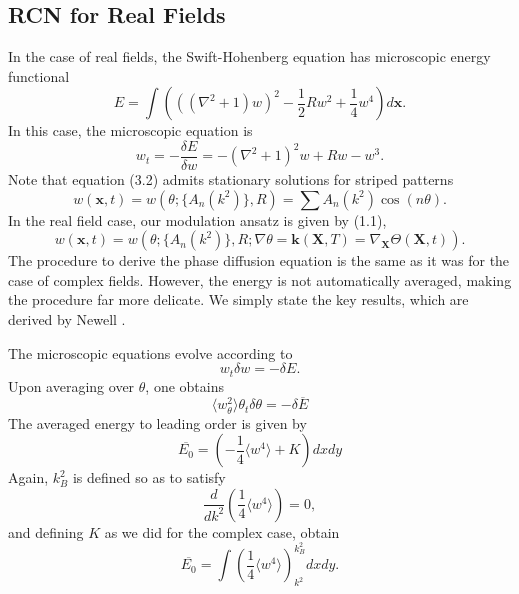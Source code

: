 \documentclass[12pt]{article}
\numberwithin{equation}{section}
\begin{document}
\subsection{RCN for Real Fields}
In the case of real fields, the Swift-Hohenberg equation has microscopic energy functional
\begin{equation}
E = \int \left( ((\nabla^2+1)w)^2-\frac{1}{2}Rw^2 + \frac{1}{4}w^4 \right)d\bm{x}.
\end{equation}
In this case, the microscopic equation is
\begin{equation}
w_t = -\frac{\delta E}{\delta w} = -(\nabla^2+1)^2w + Rw - w^3.
\end{equation}
Note that equation (3.2) admits stationary solutions for striped patterns
\begin{equation}
w(\bm{x},t) = w(\theta; \{A_n(k^2)\},R) = \sum A_n(k^2)\cos(n\theta).
\end{equation}
In the real field case, our modulation ansatz is given by (1.1),
\begin{equation}
w(\bm{x},t) = w(\theta; \{A_n(k^2)\},R; \nabla \theta = \bm{k}(\bm{X},T)=\nabla_{\bm{X}}\Theta(\bm{X},t)).
\end{equation}
The procedure to derive the phase diffusion equation is the same as it was for the case of complex fields. However, the energy is not automatically averaged, making the procedure far more delicate. We simply state the key results, which are derived by Newell \cite{NEWELL2023}.
\par
The microscopic equations evolve according to
\begin{equation}
 w_t \delta w = -\delta E.
\end{equation}
Upon averaging over $\theta$, one obtains
\begin{equation}
 \langle w_{\theta}^2\rangle\theta_t \delta \theta = -\delta \overline{E}
\end{equation}
The averaged energy to leading order is given by
\begin{equation}
\overline{E_0} = \left(-\frac{1}{4}\langle w^4 \rangle + K \right)dxdy
\end{equation}
Again, $k^2_B$ is defined so as to satisfy
\begin{equation}
\frac{d}{dk^2}\left(\frac{1}{4}\langle w^4 \rangle\right) = 0,
\end{equation}
and defining $K$ as we did for the complex case, obtain
\begin{equation}
\overline{E_0} = \int \left( \frac{1}{4}\langle w^4 \rangle\right)_{k^2}^{k^2_B}dxdy.
\end{equation}
\end{document}
